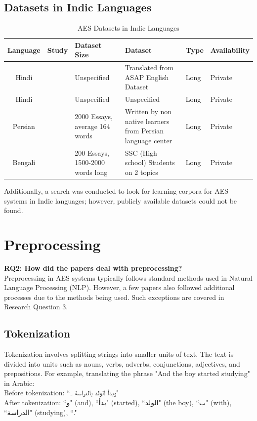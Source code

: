 \documentclass{article}
\begin{document}
	\subsection*{Datasets in Indic Languages}
	\begin{table}[H]
		\centering
		\begin{tabularx}{7in}{|c|m{2cm}|X|p{1.5in}|p{1cm}|p{1.5cm}|}
			\hline
			Language & Study & Dataset Size & Dataset & Type & Availability \\ \hline
			Hindi & \textcite{10_singh2023hindi} & Unspecified & Translated from ASAP English Dataset & Long & Private \\ \hline
			Hindi & \textcite{11_walia2024hybrid} & Unspecified & Unspecified & Long & Private \\ \hline
			Persian & \textcite{9_firoozi2024bert} & 2000 Essays, average 164 words & Written by non native learners from Persian language center & Long & Private \\ \hline
			Bengali & \textcite{24_islam2013abess} & 200 Essays, 1500-2000 words long & SSC (High school) Students on 2 topics & Long & Private \\
			\hline
		\end{tabularx}
		\caption{AES Datasets in Indic Languages}
		\label{datasetindic}
	\end{table}
	
Additionally, a search was conducted to look for learning corpora for AES systems in Indic languages; however, publicly available datasets could not be found.
	
	\section{Preprocessing}
	\textbf{RQ2: How did the papers deal with preprocessing?} \\
	Preprocessing in AES systems typically follows standard methods used in Natural Language Processing (NLP). However, a few papers also followed additional processes due to the methods being used. Such exceptions are covered in Research Question 3.
	
	\subsection{Tokenization}
	Tokenization involves splitting strings into smaller units of text. The text is divided into units such as nouns, verbs, adverbs, conjunctions, adjectives, and prepositions. 
	For example, translating the phrase "And the boy started studying" in Arabic: \\ 
	Before tokenization: ``\textarabic{وبدأ الولد بالدراسة ۔}" \\ 
	After tokenization: 
	``\textarabic{و}" (and), ``\textarabic{بدأ}" (started), ``\textarabic{الولد}" (the boy), ``\textarabic{ب}" (with), ``\textarabic{الدراسة}" (studying), ``."
	
\end{document}
